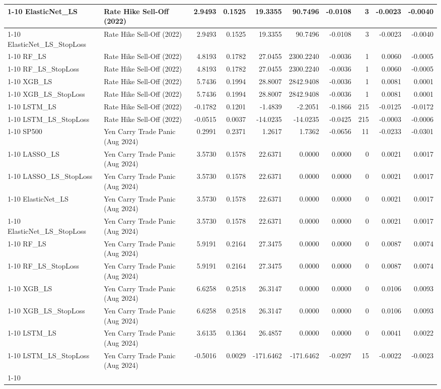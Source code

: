 \begin{tabular}{llrrrrrrrr}
\cline{1-10}
ElasticNet\_LS & Rate Hike Sell-Off (2022) & 2.9493 & 0.1525 & 19.3355 & 90.7496 & -0.0108 & 3 & -0.0023 & -0.0040 \\
\cline{1-10}
ElasticNet\_LS\_StopLoss & Rate Hike Sell-Off (2022) & 2.9493 & 0.1525 & 19.3355 & 90.7496 & -0.0108 & 3 & -0.0023 & -0.0040 \\
\cline{1-10}
RF\_LS & Rate Hike Sell-Off (2022) & 4.8193 & 0.1782 & 27.0455 & 2300.2240 & -0.0036 & 1 & 0.0060 & -0.0005 \\
\cline{1-10}
RF\_LS\_StopLoss & Rate Hike Sell-Off (2022) & 4.8193 & 0.1782 & 27.0455 & 2300.2240 & -0.0036 & 1 & 0.0060 & -0.0005 \\
\cline{1-10}
XGB\_LS & Rate Hike Sell-Off (2022) & 5.7436 & 0.1994 & 28.8007 & 2842.9408 & -0.0036 & 1 & 0.0081 & 0.0001 \\
\cline{1-10}
XGB\_LS\_StopLoss & Rate Hike Sell-Off (2022) & 5.7436 & 0.1994 & 28.8007 & 2842.9408 & -0.0036 & 1 & 0.0081 & 0.0001 \\
\cline{1-10}
LSTM\_LS & Rate Hike Sell-Off (2022) & -0.1782 & 0.1201 & -1.4839 & -2.2051 & -0.1866 & 215 & -0.0125 & -0.0172 \\
\cline{1-10}
LSTM\_LS\_StopLoss & Rate Hike Sell-Off (2022) & -0.0515 & 0.0037 & -14.0235 & -14.0235 & -0.0425 & 215 & -0.0003 & -0.0006 \\
\cline{1-10}
SP500 & Yen Carry Trade Panic (Aug 2024) & 0.2991 & 0.2371 & 1.2617 & 1.7362 & -0.0656 & 11 & -0.0233 & -0.0301 \\
\cline{1-10}
LASSO\_LS & Yen Carry Trade Panic (Aug 2024) & 3.5730 & 0.1578 & 22.6371 & 0.0000 & 0.0000 & 0 & 0.0021 & 0.0017 \\
\cline{1-10}
LASSO\_LS\_StopLoss & Yen Carry Trade Panic (Aug 2024) & 3.5730 & 0.1578 & 22.6371 & 0.0000 & 0.0000 & 0 & 0.0021 & 0.0017 \\
\cline{1-10}
ElasticNet\_LS & Yen Carry Trade Panic (Aug 2024) & 3.5730 & 0.1578 & 22.6371 & 0.0000 & 0.0000 & 0 & 0.0021 & 0.0017 \\
\cline{1-10}
ElasticNet\_LS\_StopLoss & Yen Carry Trade Panic (Aug 2024) & 3.5730 & 0.1578 & 22.6371 & 0.0000 & 0.0000 & 0 & 0.0021 & 0.0017 \\
\cline{1-10}
RF\_LS & Yen Carry Trade Panic (Aug 2024) & 5.9191 & 0.2164 & 27.3475 & 0.0000 & 0.0000 & 0 & 0.0087 & 0.0074 \\
\cline{1-10}
RF\_LS\_StopLoss & Yen Carry Trade Panic (Aug 2024) & 5.9191 & 0.2164 & 27.3475 & 0.0000 & 0.0000 & 0 & 0.0087 & 0.0074 \\
\cline{1-10}
XGB\_LS & Yen Carry Trade Panic (Aug 2024) & 6.6258 & 0.2518 & 26.3147 & 0.0000 & 0.0000 & 0 & 0.0106 & 0.0093 \\
\cline{1-10}
XGB\_LS\_StopLoss & Yen Carry Trade Panic (Aug 2024) & 6.6258 & 0.2518 & 26.3147 & 0.0000 & 0.0000 & 0 & 0.0106 & 0.0093 \\
\cline{1-10}
LSTM\_LS & Yen Carry Trade Panic (Aug 2024) & 3.6135 & 0.1364 & 26.4857 & 0.0000 & 0.0000 & 0 & 0.0041 & 0.0022 \\
\cline{1-10}
LSTM\_LS\_StopLoss & Yen Carry Trade Panic (Aug 2024) & -0.5016 & 0.0029 & -171.6462 & -171.6462 & -0.0297 & 15 & -0.0022 & -0.0023 \\
\cline{1-10}
\bottomrule
\end{tabular}
